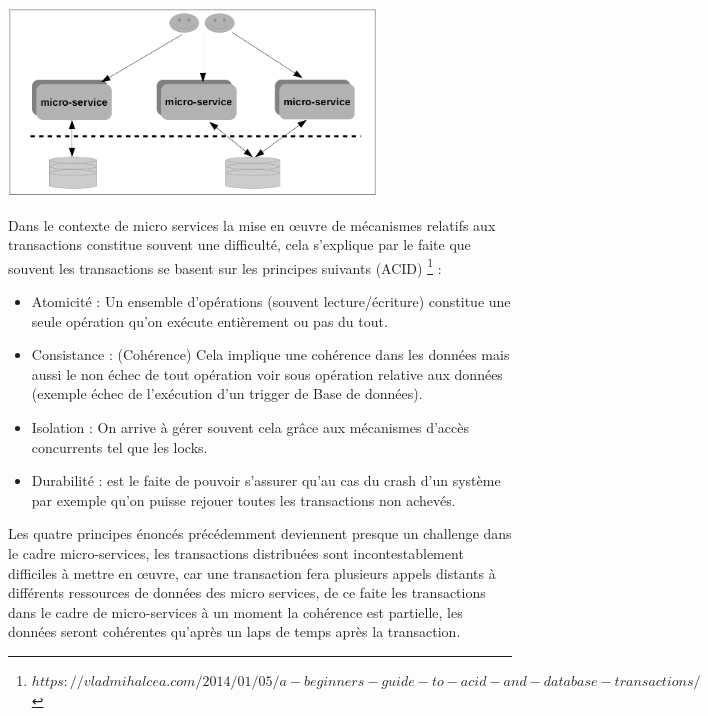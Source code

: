 \documentclass[12pt, a4paper, openany]{report}
\begin{document}
   \begin{center}
     \includegraphics[width=\textwidth, height=5cm]{decentra_db_25.png}
     \label{fig25}
   \end{center}
  
  Dans le contexte de micro services la mise en œuvre de mécanismes relatifs aux transactions constitue souvent une difficulté, cela s’explique par le faite que souvent les transactions se basent sur les principes suivants (ACID) \footnote{$https://vladmihalcea.com/2014/01/05/a-beginners-guide-to-acid-and-database-transactions/$} \cite{refbibAcid} : 
  
   \begin{itemize}
      \item Atomicité : Un ensemble d’opérations (souvent lecture/écriture) constitue une seule opération qu’on exécute entièrement ou pas du tout. 
      \item Consistance : (Cohérence) Cela implique une cohérence dans les données mais aussi le non échec de tout opération voir sous opération relative aux données (exemple échec de l’exécution d’un trigger de Base de données).
      \item Isolation : On arrive à gérer souvent cela grâce aux mécanismes d’accès concurrents tel que les locks.
      \item Durabilité : est le faite de pouvoir s’assurer qu’au cas du crash d’un système par exemple qu’on puisse rejouer toutes les transactions non achevés. 
   \end{itemize}
   
   Les quatre principes énoncés précédemment deviennent presque un challenge dans le cadre micro-services, les transactions distribuées sont incontestablement difficiles à mettre en œuvre, car une transaction fera plusieurs appels distants à différents ressources de données des micro services, de ce faite les transactions dans le cadre de micro-services à un moment la cohérence est partielle, les données seront cohérentes qu’après un laps de temps après  la transaction.
   
\end{document}
